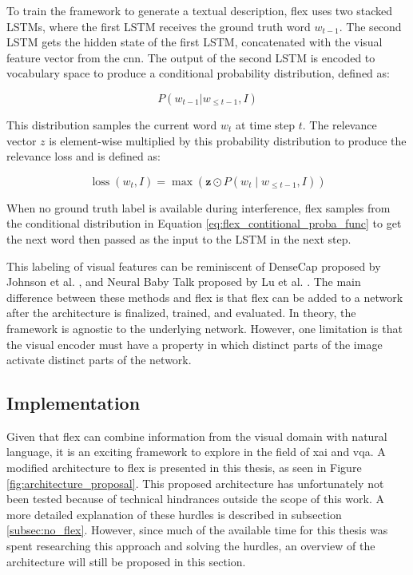         To train the framework to generate a textual description, \gls{flex} uses two stacked LSTMs, where the first LSTM receives the ground truth word $w_{t-1}$. The second LSTM gets the hidden state of the first LSTM, concatenated with the visual feature vector from the \gls{cnn}. The output of the second LSTM is encoded to vocabulary space to produce a conditional probability distribution, defined as:

        \begin{equation}
            P (w_{t-1} | w_{\le t-1}, I)
        \label{eq:flex_contitional_proba_func}
        \end{equation}
        
        This distribution samples the current word $w_t$ at time step $t$.  
        The relevance vector $z$ is element-wise multiplied by this probability distribution to produce the relevance loss and is defined as:

        \begin{equation}
            \operatorname{loss}\left(w_t, I\right)=\max \left(\boldsymbol{z} \odot P\left(w_t \mid w_{\leq t-1}, I\right)\right)
        \end{equation}

        When no ground truth label is available during interference, \gls{flex} samples from the conditional distribution in Equation \ref{eq:flex_contitional_proba_func} to get the next word then passed as the input to the LSTM in the next step.
                

   
        This labeling of visual features can be reminiscent of DenseCap proposed by Johnson et al. \cite{johnsonDenseCapFullyConvolutional2016}, and Neural Baby Talk proposed by Lu et al. \cite{luNeuralBabyTalk2018}. The main difference between these methods and \gls{flex} is that \gls{flex} can be added to a network after the architecture is finalized, trained, and evaluated. In theory, the framework is agnostic to the underlying network. However, one limitation is that the visual encoder must have a property in which distinct parts of the image activate distinct parts of the network. 
        
        
        

        \subsection{Implementation}
        Given that \gls{flex} can combine information from the visual domain with natural language, it is an exciting framework to explore in the field of \gls{xai} and \gls{vqa}. A modified architecture to \gls{flex} is presented in this thesis, as seen in Figure \ref{fig:architecture_proposal}. This proposed architecture has unfortunately not been tested because of technical hindrances outside the scope of this work. A more detailed explanation of these hurdles is described in subsection \ref{subsec:no_flex}. However, since much of the available time for this thesis was spent researching this approach and solving the hurdles, an overview of the architecture will still be proposed in this section.


